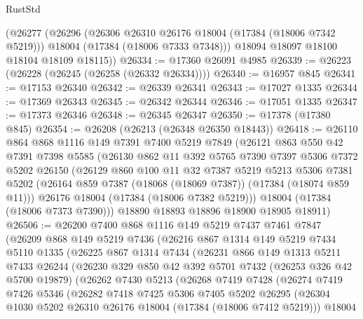 \begin{lexlean}{RustStd}
\begin{coremodule}
      (@26277
        (@26296
          (@26306 @26310 @26176 @18004 (@17384 (@18006 @7342 @5219)))
          @18004
          (@17384 (@18006 @7333 @7348)))
        @18094
        @18097
        @18100
        @18104
        @18109
        @18115))
@26334 := @17360 @26091 @4985
@26339 := @26223 (@26228 (@26245 (@26258 (@26332 @26334))))
@26340 := @16957 @845
@26341 := @17153 @26340
@26342 := @26339 @26341
@26343 := @17027 @1335
@26344 := @17369 @26343
@26345 := @26342 @26344
@26346 := @17051 @1335
@26347 := @17373 @26346
@26348 := @26345 @26347
@26350 := @17378 (@17380 @845)
@26354 := @26208 (@26213 (@26348 @26350 @18443))
@26418 := @26110
    @864
    @868
    @1116
    @149
    @7391
    @7400
    @5219
    @7849
    (@26121
      @863
      @550
      @42
      @7391
      @7398
      @5585
      (@26130
        @862
        @11
        @392
        @5765
        @7390
        @7397
        @5306
        @7372
        @5202
        @26150
        (@26129
          @860
          @100
          @11
          @32
          @7387
          @5219
          @5213
          @5306
          @7381
          @5202
          (@26164 @859 @7387 (@18068 (@18069 @7387)) (@17384 (@18074 @859 @11)))
          @26176
          @18004
          (@17384 (@18006 @7382 @5219)))
        @18004
        (@17384 (@18006 @7373 @7390)))
      @18890
      @18893
      @18896
      @18900
      @18905
      @18911)
@26506 := @26200
    @7400
    @868
    @1116
    @149
    @5219
    @7437
    @7461
    @7847
    (@26209
      @868
      @149
      @5219
      @7436
      (@26216
        @867
        @1314
        @149
        @5219
        @7434
        @5110
        @1335
        (@26225
          @867
          @1314
          @7434
          (@26231
            @866
            @149
            @1313
            @5211
            @7433
            @26244
            (@26230
              @329
              @850
              @42
              @392
              @5701
              @7432
              (@26253 @326 @42 @5700 @19879)
              (@26262
                @7430
                @5213
                (@26268
                  @7419
                  @7428
                  (@26274
                    @7419
                    @7426
                    @5346
                    (@26282
                      @7418
                      @7425
                      @5306
                      @7405
                      @5202
                      @26295
                      (@26304 @1030 @5202 @26310 @26176 @18004 (@17384 (@18006 @7412 @5219)))
                      @18004

\end{coremodule}
\end{lexlean}
